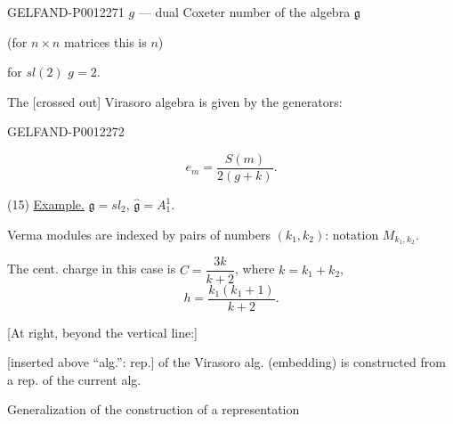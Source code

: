 \begin{GelfandAdjacentEvidence}{GELFAND-P001227}{1}
\(g\) --- dual Coxeter number of the algebra \(\mathfrak g\)

(for \(n\times n\) matrices this is \(n\))

for \(sl(2)\) \(g=2\).

The [crossed out] Virasoro algebra is given by the generators:
\end{GelfandAdjacentEvidence}
\begin{GelfandAdjacentEvidence}{GELFAND-P001227}{2}

\begin{equation*}
e_m=\frac{S(m)}{2(g+k)}.\tag{14}
\end{equation*}

(15) \underline{Example.} \(\mathfrak g=sl_2\), \(\widehat{\mathfrak g}=A_1^1\).

Verma modules are indexed by pairs of numbers \((k_1,k_2)\): notation \(M_{k_1,k_2}\).

The cent. charge in this case is \(C=\dfrac{3k}{k+2}\), where \(k=k_1+k_2\),
\begin{equation*}
h=\frac{k_1(k_1+1)}{k+2}.
\end{equation*}

[At right, beyond the vertical line:]

[inserted above “alg.”: rep.] of the Virasoro alg. (embedding) is constructed from a rep. of the current alg.

Generalization of the construction of a representation

\end{GelfandAdjacentEvidence}
